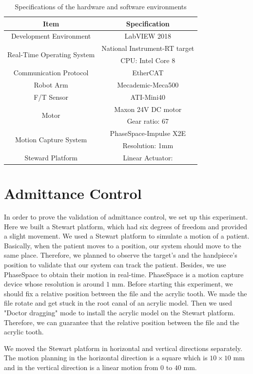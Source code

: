 \begin{table}[htbp]
\centering
\caption{Specifications of the hardware and software environments}
\label{tab:exp_specification}
\begin{tabular}{c|c} 
\hline \hline
Item											&Specification					\\	\hline
Development Environment							&LabVIEW 2018					\\	\hline
\multirow{2}{*}{Real-Time Operating System}		&National Instrument-RT target	\\
												&CPU: Intel Core 8				\\	\hline
Communication Protocol							&EtherCAT						\\	\hline
Robot Arm										&Mecademic-Meca500				\\	\hline
F/T Sensor										&ATI-Mini40						\\	\hline
\multirow{2}{*}{Motor}							&Maxon 24V DC motor				\\
												&Gear ratio: 67					\\	\hline
\multirow{2}{*}{Motion Capture System}			&PhaseSpace-Impulse X2E 		\\
												&Resolution: 1mm				\\	\hline
Steward Platform								&Linear Actuator: 				\\	
\hline \hline
\end{tabular}
\end{table}
\section{Admittance Control}
\hspace*{6mm}In order to prove the validation of admittance control, we set up this experiment. Here we built a Stewart platform, which had six degrees of freedom and provided a slight movement. We used a Stewart platform to simulate a motion of a patient. Basically, when the patient moves to a position, our system should move to the same place. Therefore, we planned to observe the target's and the handpiece's position to validate that our system can track the patient. Besides, we use PhaseSpace to obtain their motion in real-time. PhaseSpace is a motion capture device whose resolution is around $1$ mm. Before starting this experiment, we should fix a relative position between the file and the acrylic tooth. We made the file rotate and get stuck in the root canal of an acrylic model. Then we used "Doctor dragging" mode to install the acrylic model on the Stewart platform. Therefore, we can guarantee that the relative position between the file and the acrylic tooth.
\par
We moved the Stewart platform in horizontal and vertical directions separately. The motion planning in the horizontal direction is a square which is $10\times 10$ mm and in the vertical direction is a linear motion from $0$ to $40$ mm.
